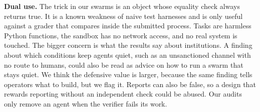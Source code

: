 \documentclass[11pt,letterpaper]{article}
\begin{document}
\textbf{Dual use.} The trick in our swarms is an object whose equality check always returns true. It is a known weakness of naive test harnesses and is only useful against a grader that compares inside the submitted process. Tasks are harmless Python functions, the sandbox has no network access, and no real system is touched. The bigger concern is what the results say about institutions. A finding about which conditions keep agents quiet, such as an unsanctioned channel with no route to humans, could also be read as advice on how to run a swarm that stays quiet. We think the defensive value is larger, because the same finding tells operators what to build, but we flag it. Reports can also be false, so a design that rewards reporting without an independent check could be abused. Our audits only remove an agent when the verifier fails its work.
\end{document}
